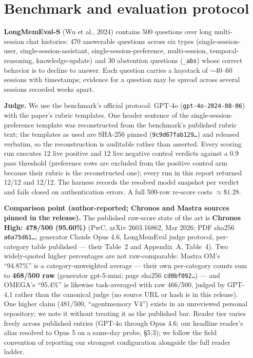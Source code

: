 \documentclass[11pt]{article}
\begin{document}
\section{Benchmark and evaluation protocol}
\textbf{LongMemEval-S} (Wu et al., 2024) contains 500 questions over long
multi-session chat histories: 470 answerable questions across six types
(single-session-user, single-session-assistant, single-session-preference,
multi-session, temporal-reasoning, knowledge-update) and 30 abstention
questions (\texttt{\_abs}) whose correct behavior is to decline to answer.
Each question carries a haystack of $\sim$40--60 sessions with timestamps;
evidence for a question may be spread across several sessions recorded
weeks apart.

\textbf{Judge.} We use the benchmark's official protocol: GPT-4o
(\texttt{gpt-4o-2024-08-06}) with the paper's rubric templates. One header
sentence of the single-session-preference template was reconstructed from the
benchmark's published rubric text; the templates as used are SHA-256 pinned
(\texttt{9c9d67fab129\ldots}) and released verbatim, so the reconstruction is
auditable rather than asserted. Every scoring run executes 12 live positive and
12 live negative control verdicts against a 0.9 pass threshold (preference rows
are excluded from the positive control arm because their rubric is the
reconstructed one); every run in this report returned 12/12 and 12/12. The
harness records the resolved model snapshot per verdict and fails closed on
authentication errors. A full 500-row re-score costs $\approx\$1.28$.

\textbf{Comparison point (author-reported; Chronos and Mastra sources pinned
in the release).} The published
raw-score state of the art is \textbf{Chronos High: 478/500 (95.60\%)} (PwC,
arXiv 2603.16862, Mar 2026; PDF sha256 \texttt{a6a75d61\ldots}; generator Claude Opus 4.6, LongMemEval judge
protocol, per-category table published --- their Table~2 and Appendix~A,
Table~4). Two widely-quoted higher percentages
are not raw-comparable: Mastra OM's ``94.87\%'' is a category-unweighted
average --- their own per-category counts sum to \textbf{468/500 raw}
(generator gpt-5-mini; page sha256 \texttt{cd0bf092\ldots}) --- and OMEGA's ``95.4\%'' is likewise task-averaged
with raw 466/500, judged by GPT-4.1 rather than the canonical judge (no source URL or hash is in this release). One higher
claim (481/500, ``agentmemory V4'') exists in an unreviewed personal
repository; we note it without treating it as the published bar. Reader tier
varies freely across published entries (GPT-4o through Opus 4.6; our headline
reader's alias resolved to Opus 5 on a same-day probe, \S5.3); we follow the
field convention of reporting our strongest configuration alongside the full
reader ladder.
\end{document}
